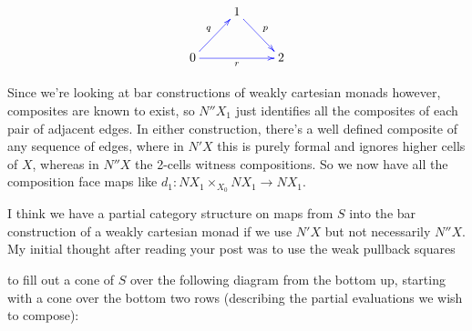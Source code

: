 \documentclass{amsart}
\begin{document}
\[
\xymatrix{
 &1\ar@[blue][dr]^p&\\
0 \ar@[blue][rr]_r \ar@[blue][ur]^q && 2
}\]

Since we're looking at bar constructions of weakly cartesian monads however, composites are known to exist, so $N''X_1$ just identifies all the composites of each pair of adjacent edges. In either construction, there's a well defined composite of any sequence of edges, where in $N'X$ this is purely formal and ignores higher cells of $X$, whereas in $N''X$ the 2-cells witness compositions. So we now have all the composition face maps like $d_1 : NX_1 \times_{X_0} NX_1 \to NX_1$.

I think we have a partial category structure on maps from $S$ into the bar construction of a weakly cartesian monad if we use $N'X$ but not necessarily $N''X$.  My initial thought after reading your post was to use the weak pullback squares

\begin{center}\end{center}

to fill out a cone of $S$ over the following diagram from the bottom up, starting with a cone over the bottom two rows (describing the partial evaluations we wish to compose):

\vfill

\begin{center}\end{center}
\end{document}
